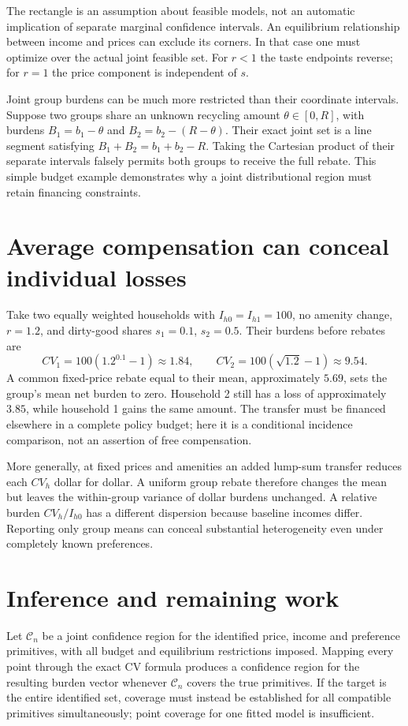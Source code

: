\documentclass[11pt]{article}
\begin{document}
The rectangle is an assumption about feasible models, not an automatic implication of separate marginal confidence intervals. An equilibrium relationship between income and prices can exclude its corners. In that case one must optimize over the actual joint feasible set. For $r<1$ the taste endpoints reverse; for $r=1$ the price component is independent of $s$.

Joint group burdens can be much more restricted than their coordinate intervals. Suppose two groups share an unknown recycling amount $\theta\in[0,R]$, with burdens $B_1=b_1-\theta$ and $B_2=b_2-(R-\theta)$. Their exact joint set is a line segment satisfying $B_1+B_2=b_1+b_2-R$. Taking the Cartesian product of their separate intervals falsely permits both groups to receive the full rebate. This simple budget example demonstrates why a joint distributional region must retain financing constraints.

\section*{Average compensation can conceal individual losses}
Take two equally weighted households with $I_{h0}=I_{h1}=100$, no amenity change, $r=1.2$, and dirty-good shares $s_1=0.1$, $s_2=0.5$. Their burdens before rebates are
\[
 CV_1=100(1.2^{0.1}-1)\approx1.84,\qquad
 CV_2=100(\sqrt{1.2}-1)\approx9.54.
\]
A common fixed-price rebate equal to their mean, approximately $5.69$, sets the group's mean net burden to zero. Household 2 still has a loss of approximately $3.85$, while household 1 gains the same amount. The transfer must be financed elsewhere in a complete policy budget; here it is a conditional incidence comparison, not an assertion of free compensation.

More generally, at fixed prices and amenities an added lump-sum transfer reduces each $CV_h$ dollar for dollar. A uniform group rebate therefore changes the mean but leaves the within-group variance of dollar burdens unchanged. A relative burden $CV_h/I_{h0}$ has a different dispersion because baseline incomes differ. Reporting only group means can conceal substantial heterogeneity even under completely known preferences.

\section*{Inference and remaining work}
Let $\mathcal C_n$ be a joint confidence region for the identified price, income and preference primitives, with all budget and equilibrium restrictions imposed. Mapping every point through the exact CV formula produces a confidence region for the resulting burden vector whenever $\mathcal C_n$ covers the true primitives. If the target is the entire identified set, coverage must instead be established for all compatible primitives simultaneously; point coverage for one fitted model is insufficient.
\end{document}
